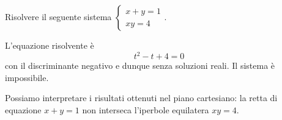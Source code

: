 \begin{esempio}
Risolvere il seguente sistema 
\(\left\{\begin{array}{l}{x+y=1}\\{xy=4}\end{array}\right.\).
\begin{multicols}{2}
L'equazione risolvente è \[ t^2-t+4=0 \] con il discriminante negativo e dunque 
senza soluzioni reali. Il sistema è impossibile.

Possiamo interpretare i risultati ottenuti nel piano cartesiano: la retta di 
equazione \(x+y=1\) non interseca l'iperbole equilatera \({xy}=4\).
\begin{center}

\end{center}
\end{multicols}
\end{esempio}

